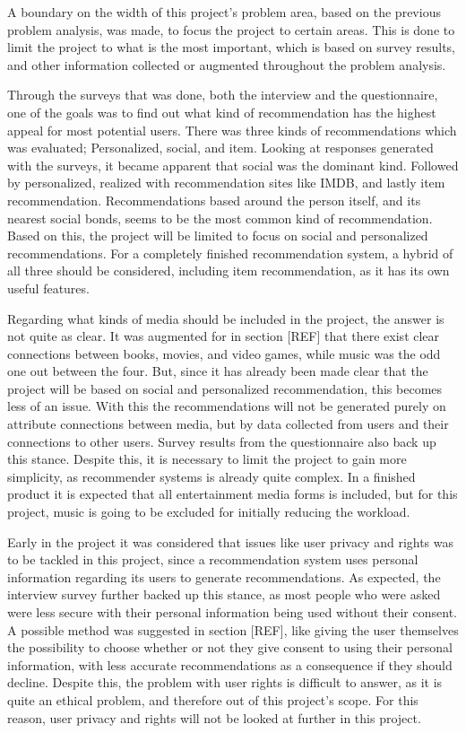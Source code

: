 A boundary on the width of this project's problem area, based on the previous problem analysis, was made, to focus the project to certain areas. This is done to limit the project to what is the most important, which is based on survey results, and other information collected or augmented throughout the problem analysis.

Through the surveys that was done, both the interview and the questionnaire, one of the goals was to find out what kind of recommendation has the highest appeal for most potential users. There was three kinds of recommendations which was evaluated; Personalized, social, and item. Looking at responses generated with the surveys, it became apparent that social was the dominant kind. Followed by personalized, realized with recommendation sites like IMDB, and lastly item recommendation. Recommendations based around the person itself, and its nearest social bonds, seems to be the most common kind of recommendation. Based on this, the project will be limited to focus on social and personalized recommendations. For a completely finished recommendation system, a hybrid of all three should be considered, including item recommendation, as it has its own useful features.

Regarding what kinds of media should be included in the project, the answer is not quite as clear. It was augmented for in section [REF] that there exist clear connections between books, movies, and video games, while music was the odd one out between the four. But, since it has already been made clear that the project will be based on social and personalized recommendation, this becomes less of an issue. With this the recommendations will not be generated purely on attribute connections between media, but by data collected from users and their connections to other users. Survey results from the questionnaire also back up this stance. Despite this, it is necessary to limit the project to gain more simplicity, as recommender systems is already quite complex. In a finished product it is expected that all entertainment media forms is included, but for this project, music is going to be excluded for initially reducing the workload.

Early in the project it was considered that issues like user privacy and rights was to be tackled in this project, since a recommendation system uses personal information regarding its users to generate recommendations. As expected, the interview survey further backed up this stance, as most people who were asked were less secure with their personal information being used without their consent. A possible method was suggested in section [REF], like giving the user themselves the possibility to choose whether or not they give consent to using their personal information, with less accurate recommendations as a consequence if they should decline. Despite this, the problem with user rights is difficult to answer, as it is quite an ethical problem, and therefore out of this project’s scope. For this reason, user privacy and rights will not be looked at further in this project.

